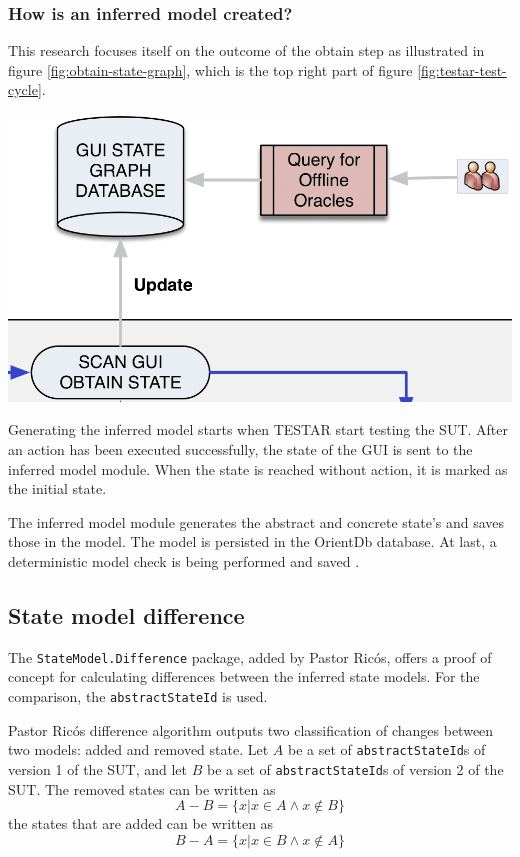 \subsubsection{How is an inferred model created?}
This research focuses itself on the outcome of the obtain step as illustrated in figure \ref{fig:obtain-state-graph}, which is the top right part of figure \ref{fig:testar-test-cycle}.

\bigskip
\begingroup
\captionsetup{type=figure}
\includegraphics[scale=0.4]{images/obtain-state-graph.png}
\label{fig:obtain-state-graph}
\endgroup

Generating the inferred model starts when TESTAR start testing the SUT. After an action has been executed successfully, the state of the GUI is sent to the inferred model module. When the state is reached without action, it is marked as the initial state. 

The inferred model module generates the abstract and concrete state's and saves those in the model. The model is persisted in the OrientDb database. At last, a deterministic model check is being performed and saved \cite{testar-code}.

\subsection{State model difference}
The \verb|StateModel.Difference| package, added by Pastor Ricós\cite{stateDiff}, offers a proof of concept for calculating differences between the inferred state models. For the comparison, the \verb|abstractStateId| is used. 

Pastor Ricós difference algorithm\cite{stateDiff} outputs two classification of changes between two models: added and removed state. Let $A$ be a set of \verb|abstractStateId|s of version 1 of the SUT, and let $B$ be a set of \verb|abstractStateId|s of version 2 of the SUT. The removed states can be written as
\[A-B = \lbrace x | x \in A \wedge x \notin B \rbrace\]
the states that are added can be written as
\[B-A = \lbrace x | x \in B \wedge x \notin A \rbrace\]


